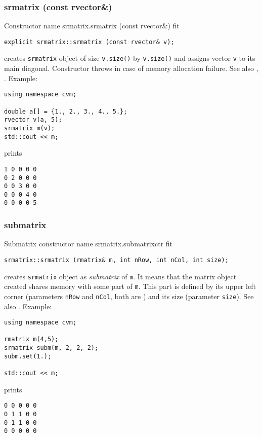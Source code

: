 \subsubsection{srmatrix (const rvector\&)}
Constructor%
\pdfdest name {srmatrix.srmatrix (const rvector&)} fit
\begin{verbatim}
explicit srmatrix::srmatrix (const rvector& v);
\end{verbatim}
creates  \verb"srmatrix" object
of size \verb"v.size()" by \verb"v.size()"
and assigns vector \verb"v" to its main diagonal.
Constructor throws  
in case of memory allocation failure.
See also , .
Example:
\begin{Verbatim}
using namespace cvm;

double a[] = {1., 2., 3., 4., 5.};
rvector v(a, 5);
srmatrix m(v);
std::cout << m;
\end{Verbatim}
prints
\begin{Verbatim}
1 0 0 0 0
0 2 0 0 0
0 0 3 0 0
0 0 0 4 0
0 0 0 0 5
\end{Verbatim}
\newpage



\subsubsection{submatrix}
Submatrix constructor%
\pdfdest name {srmatrix.submatrixctr} fit
\begin{verbatim}
srmatrix::srmatrix (rmatrix& m, int nRow, int nCol, int size);
\end{verbatim}
creates  \verb"srmatrix" object as  \emph{submatrix} of \verb"m".
It means that the matrix object created shares  memory with some part
of \verb"m". This part is defined by its upper left corner (parameters 
\verb"nRow" and \verb"nCol", both are \Based)
and its size (parameter \verb"size").
See also .
Example:
\begin{Verbatim}
using namespace cvm;

rmatrix m(4,5);
srmatrix subm(m, 2, 2, 2);
subm.set(1.);

std::cout << m;
\end{Verbatim}
prints
\begin{Verbatim}
0 0 0 0 0
0 1 1 0 0
0 1 1 0 0
0 0 0 0 0
\end{Verbatim}
\newpage




